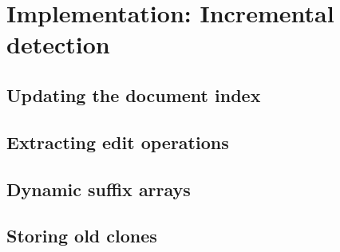 \chapter{Implementation: Incremental detection}

\section{Updating the document index}

\section{Extracting edit operations}

\section{Dynamic suffix arrays}

\section{Storing old clones}


